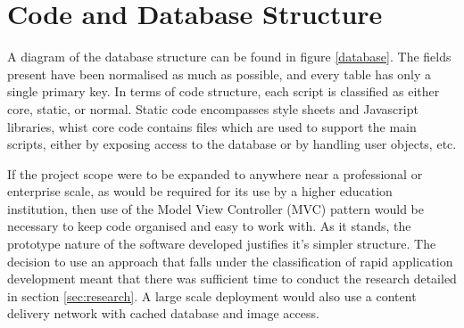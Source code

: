 \documentclass[12pt,a4paper,twoside]{report}
\begin{document}
\section{Code and Database Structure}
A diagram of the database structure can be found in figure \ref{database}. The fields present have been normalised as much as possible, and every table has only a single primary key. In terms of code structure, each script is classified as either core, static, or normal. Static code encompasses style sheets and Javascript libraries, whist core code contains files which are used to support the main scripts, either by exposing access to the database or by handling user objects, etc. 

If the project scope were to be expanded to anywhere near a professional or enterprise scale, as would be required for its use by a higher education institution, then use of the Model View Controller (MVC) pattern would be necessary to keep code organised and easy to work with. As it stands, the prototype nature of the software developed justifies it's simpler structure. The decision to use an approach that falls under the classification of rapid application development meant that there was sufficient time to conduct the research detailed in section \ref{sec:research}. A large scale deployment would also use a content delivery network with cached database and image access.
\end{document}
